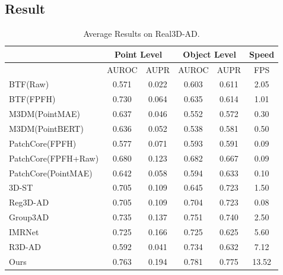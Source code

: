 \subsection{Result}


\begin{table}[ht]
\centering
\caption{Average Results on Real3D-AD.}
\label{tab:Real3D}
\begin{tabular}{l|cc|cc|c}
\hline
& \multicolumn{2}{c|}{Point Level} & \multicolumn{2}{c|}{Object Level} & Speed \\
\hline
& AUROC & AUPR & AUROC & AUPR & FPS \\ 
\hline
BTF(Raw)                            & 0.571 & 0.022 & 0.603 & 0.611  & 2.05 \\
BTF(FPFH)                           & 0.730 & 0.064 & 0.635 & 0.614  & 1.01 \\
M3DM(PointMAE)                      & 0.637 & 0.046 & 0.552 & 0.572  & 0.30 \\
M3DM(PointBERT)                     & 0.636 & 0.052 & 0.538 & 0.581  & 0.50 \\
PatchCore(FPFH)                     & 0.577 & 0.071 & 0.593 & 0.591  & 0.09 \\
PatchCore(FPFH+Raw)                 & 0.680 & 0.123 & 0.682 & 0.667  & 0.09 \\
PatchCore(PointMAE)                 & 0.642 & 0.058 & 0.594 & 0.633  & 0.10 \\
3D-ST \cite{bergmann2023anomaly}    & 0.705 & 0.109 & 0.645 & 0.723  & 1.50 \\
Reg3D-AD \cite{liu2023real3d}      & 0.705 & 0.109 & 0.704 & 0.723  & 0.08 \\
Group3AD   \cite{zhu2024towards}    & 0.735 & 0.137 & 0.751 & 0.740  & 2.50 \\
IMRNet   \cite{li2024towards}       & 0.725 & 0.166 & 0.725 & 0.625  & 5.60 \\
R3D-AD   \cite{zhou2024r3d}         & 0.592 & 0.041 & 0.734 & 0.632  & 7.12 \\
Ours                                & 0.763 & 0.194 & 0.781 & 0.775 & 13.52 \\
\hline
\end{tabular}
\end{table}


